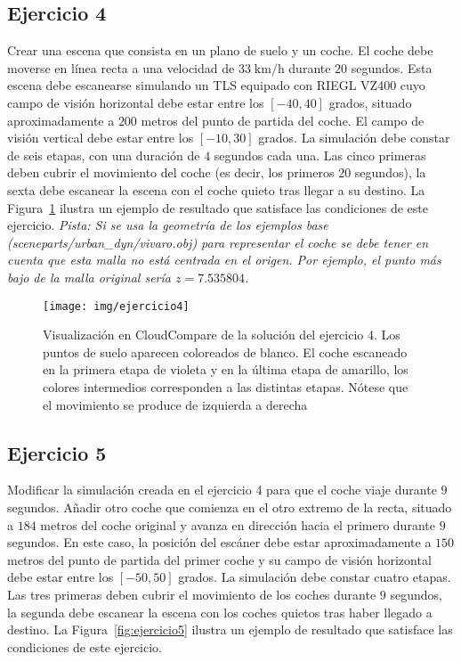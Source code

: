 \documentclass[]{article}
\begin{document}
	\pagebreak
	

	\subsection*{Ejercicio 4}
	Crear una escena que consista en un plano de suelo y un coche. El coche debe moverse en línea recta a una velocidad de $33 \;\mathrm{km}/\mathrm{h}$ durante $20$ segundos. Esta escena debe escanearse simulando un TLS equipado con RIEGL VZ400 cuyo campo de visión horizontal debe estar entre los $[-40, 40]$ grados, situado aproximadamente a $200$ metros del punto de partida del coche. El campo de visión vertical debe estar entre los $[-10, 30]$ grados. La simulación debe constar de seis etapas, con una duración de $4$ segundos cada una. Las cinco primeras deben cubrir el movimiento del coche (es decir, los primeros $20$ segundos), la sexta debe escanear la escena con el coche quieto tras llegar a su destino. La Figura~\ref{fig:ejercicio4} ilustra un ejemplo de resultado que satisface las condiciones de este ejercicio. \textit{Pista: Si se usa la geometría de los ejemplos base (sceneparts/urban\_dyn/vivaro.obj) para representar el coche se debe tener en cuenta que esta malla no está centrada en el origen. Por ejemplo, el punto más bajo de la malla original sería $z=7.535804$.}

	\begin{figure}[htb]
		\centering
		\texttt{[image: img/ejercicio4]}
		\caption{Visualización en CloudCompare de la solución del ejercicio 4. Los puntos de suelo aparecen coloreados de blanco. El coche escaneado en la primera etapa de violeta y en la última etapa de amarillo, los colores intermedios corresponden a las distintas etapas. Nótese que el movimiento se produce de izquierda a derecha}
		\label{fig:ejercicio4}
	\end{figure} 
	
	\pagebreak
	
	
	\subsection*{Ejercicio 5}
	Modificar la simulación creada en el ejercicio 4 para que el coche viaje durante $9$ segundos. Añadir otro coche que comienza en el otro extremo de la recta, situado a $184$ metros del coche original y avanza en dirección hacia el primero durante $9$ segundos. En este caso, la posición del escáner debe estar aproximadamente a $150$ metros del punto de partida del primer coche y su campo de visión horizontal debe estar entre los $[-50, 50]$ grados. La simulación debe constar cuatro etapas. Las tres primeras deben cubrir el movimiento de los coches durante $9$ segundos, la segunda debe escanear la escena con los coches quietos tras haber llegado a destino. La Figura~\ref{fig:ejercicio5} ilustra un ejemplo de resultado que satisface las condiciones de este ejercicio.
	
\end{document}
